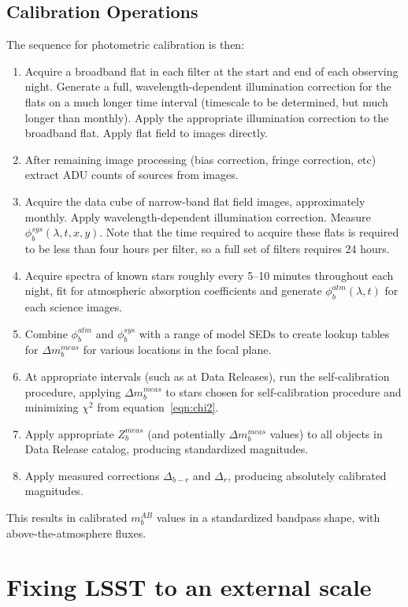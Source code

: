 \documentclass[12pt,preprint]{aastex}
\begin{document}
\subsection{Calibration Operations}
The sequence for photometric calibration is then:
\begin{enumerate}
\item{Acquire a broadband flat in each filter at the start and end
of each observing night. Generate a full, wavelength-dependent
illumination correction for the flats on a much longer time interval
(timescale to be determined, but much longer than monthly). Apply
the appropriate illumination correction to the broadband flat. Apply
flat field to images directly.}
\item{After remaining image processing (bias correction, fringe
correction, etc) extract ADU counts of sources from images. }
\item{Acquire the data cube of narrow-band flat field images,
approximately monthly. Apply wavelength-dependent illumination
correction. Measure $\phi_b^{sys}(\lambda,t,x,y)$. Note that the time
required to acquire these flats is required to be less than four hours
per filter, so a full set of filters requires 24 hours.}
\item{Acquire spectra of known stars roughly every 5--10 minutes
throughout each night, fit for atmospheric absorption coefficients and
generate $\phi_b^{atm}(\lambda,t)$ for each science images. }
\item{Combine $\phi_b^{atm}$ and $\phi_b^{sys}$ with a range of model
SEDs to create lookup tables for $\Delta m_b^{meas}$ for various
locations in the focal plane. }
\item{At appropriate intervals (such as at Data Releases), run the
self-calibration procedure, applying $\Delta m_b^{meas}$ to stars
chosen for self-calibration procedure and minimizing $\chi^2$ from
equation~\ref{eqn:chi2}.}
\item{Apply appropriate $Z_b^{meas}$ (and potentially $\Delta
m_b^{meas}$ values) to all objects in Data Release catalog, producing
standardized magnitudes.}
\item{Apply measured corrections $\Delta_{b-r}$ and $\Delta_r$,
producing absolutely calibrated magnitudes.}
\end{enumerate}
This results in calibrated $m_b^{AB}$ values in a standardized
bandpass shape, with above-the-atmosphere fluxes.

\section{Fixing LSST to an external scale}
\label{sec:calib_external}
\end{document}
